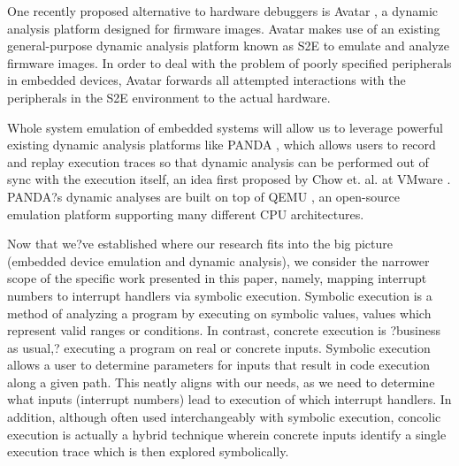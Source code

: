 \documentclass[letterpaper, 10 pt, conference]{ieeeconf}
\begin{document}
One recently proposed alternative to hardware debuggers is Avatar \cite{avatar}, a dynamic analysis platform designed for firmware images. Avatar makes use of an existing general-purpose dynamic analysis platform known as S2E \cite{s2e} to emulate and analyze firmware images. In order to deal with the problem of poorly specified peripherals in embedded devices, Avatar forwards all attempted interactions with the peripherals in the S2E environment to the actual hardware. 

Whole system emulation of embedded systems will allow us to leverage powerful existing dynamic analysis platforms like PANDA \cite{panda}, which allows users to record and replay execution traces so that dynamic analysis can be performed out of sync with the execution itself, an idea first proposed by Chow et. al. at VMware \cite{jchow}. PANDA?s dynamic analyses are built on top of QEMU \cite{qemu}, an open-source emulation platform supporting many different CPU architectures. 

Now that we?ve established where our research fits into the big picture (embedded device emulation and dynamic analysis), we consider the narrower scope of the specific work presented in this paper, namely, mapping interrupt numbers to interrupt handlers via symbolic execution. Symbolic execution \cite{jking} is a method of analyzing a program by executing on symbolic values, values which represent valid ranges or conditions. In contrast, concrete execution is ?business as usual,? executing a program on real or concrete inputs. Symbolic execution allows a user to determine parameters for inputs that result in code execution along a given path. This neatly aligns with our needs, as we need to determine what inputs (interrupt numbers) lead to execution of which interrupt handlers. In addition, although often used interchangeably with symbolic execution, concolic execution \cite{ksen} is actually a hybrid technique wherein concrete inputs identify a single execution trace which is then explored symbolically. 
\end{document}
